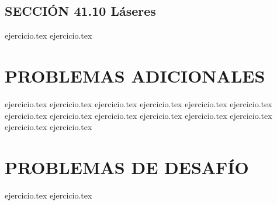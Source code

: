\subsection*{SECCIÓN 41.10 Láseres}
\begin{enumerate}
    \setcounter{enumi}{34}
    {ejercicio.tex}
    {ejercicio.tex}
\end{enumerate}

\section*{PROBLEMAS ADICIONALES}
\begin{enumerate}
    \setcounter{enumi}{36}
    {ejercicio.tex}
    {ejercicio.tex}
    {ejercicio.tex}
    {ejercicio.tex}
    {ejercicio.tex}
    {ejercicio.tex}
    {ejercicio.tex}
    {ejercicio.tex}
    {ejercicio.tex}
    {ejercicio.tex}
    {ejercicio.tex}
    {ejercicio.tex}
    {ejercicio.tex}
    {ejercicio.tex}
\end{enumerate}

\section*{PROBLEMAS DE DESAFÍO}
\begin{enumerate}
    \setcounter{enumi}{50}
    {ejercicio.tex}
    {ejercicio.tex}
\end{enumerate}
